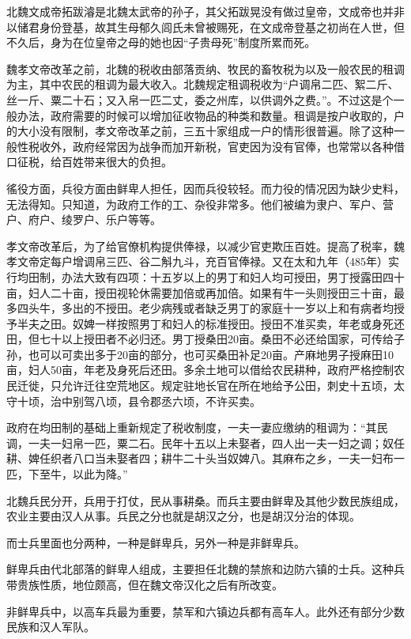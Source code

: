 北魏文成帝拓跋濬是北魏太武帝的孙子，其父拓跋晃没有做过皇帝，文成帝也并非以储君身份登基，故其生母郁久闾氏未曾被赐死，在文成帝登基之初尚在人世，但不久后，身为在位皇帝之母的她也因“子贵母死”制度所累而死。

魏孝文帝改革之前，北魏的税收由部落贡纳、牧民的畜牧税为以及一般农民的租调为主，其中农民的租调为最大收入。北魏规定租调税收为“户调帛二匹、絮二斤、丝一斤、粟二十石；又入帛一匹二丈，委之州库，以供调外之费。”。不过这是个一般办法，政府需要的时候可以增加征收物品的种类和数量。租调是按户收取的，户的大小没有限制，孝文帝改革之前，三五十家组成一户的情形很普遍。除了这种一般性税收外，政府经常因为战争而加开新税，官吏因为没有官俸，也常常以各种借口征税，给百姓带来很大的负担。

徭役方面，兵役方面由鲜卑人担任，因而兵役较轻。而力役的情况因为缺少史料，无法得知。只知道，为政府工作的工、杂役非常多。他们被编为隶户、军户、营户、府户、绫罗户、乐户等等。

孝文帝改革后，为了给官僚机构提供俸禄，以减少官吏欺压百姓。提高了税率，魏孝文帝定每户增调帛三匹、谷二斛九斗，充百官俸禄。又在太和九年（485年）实行均田制，办法大致有四项：十五岁以上的男丁和妇人均可授田，男丁授露田四十亩，妇人二十亩，授田视轮休需要加倍或再加倍。如果有牛一头则授田三十亩，最多四头牛，多出的不授田。老少病残或者缺乏男丁的家庭十一岁以上和有病者均授予半夫之田。奴婢一样按照男丁和妇人的标准授田。授田不准买卖，年老或身死还田，但七十以上授田者不必归还。男丁授桑田20亩。桑田不必还给国家，可传给子孙，也可以可卖出多于20亩的部分，也可买桑田补足20亩。产麻地男子授麻田10亩，妇人50亩，年老及身死后还田。多余土地可以借给农民耕种，政府严格控制农民迁徙，只允许迁往空荒地区。规定驻地长官在所在地给予公田，刺史十五顷，太守十顷，治中别驾八顷，县令郡丞六顷，不许买卖。

政府在均田制的基础上重新规定了税收制度，一夫一妻应缴纳的租调为：“其民调，一夫一妇帛一匹，粟二石。民年十五以上未娶者，四人出一夫一妇之调；奴任耕、婢任织者八口当未娶者四；耕牛二十头当奴婢八。其麻布之乡，一夫一妇布一匹，下至牛，以此为降。”

北魏兵民分开，兵用于打仗，民从事耕桑。而兵主要由鲜卑及其他少数民族组成，农业主要由汉人从事。兵民之分也就是胡汉之分，也是胡汉分治的体现。

而士兵里面也分两种，一种是鲜卑兵，另外一种是非鲜卑兵。

鲜卑兵由代北部落的鲜卑人组成，主要担任北魏的禁旅和边防六镇的士兵。这种兵带贵族性质，地位颇高，但在魏文帝汉化之后有所改变。

非鲜卑兵中，以高车兵最为重要，禁军和六镇边兵都有高车人。此外还有部分少数民族和汉人军队。


